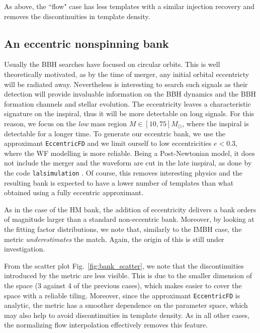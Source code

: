 \documentclass[twocolumn,showpacs,preprintnumbers,nofootinbib,prd,
superscriptaddress,10pt]{revtex4-2}
\begin{document}
As above, the ``flow" case has less templates with a similar injection recovery and removes the discontinuities in template density.

\subsection{An eccentric nonspinning bank}\label{sec:eccentric_bank}

Usually the BBH searches have focused on circular orbits.
This is well theoretically motivated, as by the time of merger, any initial orbital eccentricty will be radiated away. Nevertheless is interesting to search such signals as their detection will provide invaluable information on the BBH dynamics and the BBH formation channels and stellar evolution.
The eccentricity leaves a characteristic signature on the inspiral, thus it will be more detectable on long signals. For this reason, we focus on the {\it low} mass region $M\in [10,75] M_\odot$, where the inspiral is detectable for a longer time.
To generate our eccentric bank, we use the approximant \texttt{EccentricFD} \cite{PhysRevD.93.124061} and we limit ourself to low eccentricities $e<0.3$, where the WF modelling is more reliable. Being a Post-Newtonian model, it does not include the merger and the waveform are cut in the late inspiral, as done by the code \texttt{lalsimulation} \cite{lalsuite}. Of course, this removes interesting physics and the resulting bank is expected to have a lower number of templates than what obtained using a fully eccentric approximant.

As in the case of the HM bank, the addition of eccentricity delivers a bank orders of magnitude larger than a standard non-eccentric bank.
Moreover, by looking at the fitting factor distributions, we note that, similarly to the IMBH case, the metric {\it underestimates} the match. Again, the origin of this is still under investigation.

From the scatter plot Fig.~\ref{fig:bank_scatter}, we note that the discontinuities introduced by the metric are less visible. This is due to the smaller dimension of the space (3 against 4 of the previous cases), which makes easier to cover the space with a reliable tiling. Moreover, since the approximant \texttt{EccentricFD} is analytic, the metric has a smoother dependence on the parameter space, which may also help to avoid discontinuities in template density.
As in all other cases, the normalizing flow interpolation effectively removes this feature.
\end{document}
